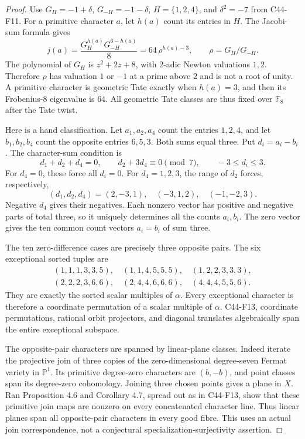 \documentclass[11pt]{article}
\theoremstyle{remark}\newtheorem{remark}[theorem]{Remark}
\begin{document}
\begin{proof}
Use \(G_H=-1+\delta\), \(G_{-H}=-1-\delta\),
\(H=\{1,2,4\}\), and \(\delta^2=-7\) from C44-F11.
For a primitive character \(a\), let \(h(a)\) count its entries in
\(H\). The Jacobi-sum formula gives
\[
 j(a)=\frac{G_H^{h(a)}G_{-H}^{6-h(a)}}8
     =64\,\rho^{h(a)-3},\qquad \rho=G_H/G_{-H}.
\]
The polynomial of \(G_H\) is \(z^2+2z+8\), with \(2\)-adic
Newton valuations \(1,2\). Therefore \(\rho\) has valuation
\(1\) or \(-1\) at a prime above \(2\) and is not a root of
unity. A primitive character is geometric Tate exactly when
\(h(a)=3\), and then its Frobenius-\(8\) eigenvalue is \(64\).
All geometric Tate classes are thus fixed over \(\mathbb F _8\)
after the Tate twist.

Here is a hand classification. Let \(a_1,a_2,a_4\) count the
entries \(1,2,4\), and let \(b_1,b_2,b_4\) count the opposite
entries \(6,5,3\). Both sums equal three. Put \(d_i=a_i-b_i\).
The character-sum condition is
\[
 d_1+d_2+d_4=0,\qquad d_2+3d_4\equiv0\pmod7,\qquad
 -3\le d_i\le3.
\]
For \(d_4=0\), these force all \(d_i=0\).
For \(d_4=1,2,3\), the range of \(d_2\) forces, respectively,
\[
 (d_1,d_2,d_4)=(2,-3,1),\quad(-3,1,2),\quad(-1,-2,3).
\]
Negative \(d_4\) gives their negatives. Each nonzero vector
has positive and negative parts of total three, so it uniquely
determines all the counts \(a_i,b_i\). The zero vector gives
the ten common count vectors \(a_i=b_i\) of sum three.

The ten zero-difference cases are precisely three opposite pairs.
The six exceptional sorted tuples are
\[
\begin{gathered}
 (1,1,1,3,3,5),\quad(1,1,4,5,5,5),\quad(1,2,2,3,3,3),\\
 (2,2,2,3,6,6),\quad(2,4,4,6,6,6),\quad(4,4,4,5,5,6).
\end{gathered}
\]
They are exactly the sorted scalar multiples of \(\alpha\).
Every exceptional character is therefore a coordinate permutation
of a scalar multiple of \(\alpha\). C44-F13, coordinate permutations,
rational orbit projectors, and diagonal translates algebraically
span the entire exceptional subspace.

The opposite-pair characters are spanned by linear-plane classes.
Indeed iterate the projective join of three copies of the
zero-dimensional degree-seven Fermat variety in \(\mathbb P^1\).
Its primitive degree-zero characters are \((b,-b)\), and point
classes span its degree-zero cohomology. Joining three chosen
points gives a plane in \(X\). Ran Proposition 4.6 and Corollary 4.7,
spread out as in C44-F13, show that these primitive join maps
are nonzero on every concatenated character line. Thus linear
planes span all opposite-pair characters in every good fibre.
This uses an actual join correspondence, not a conjectural
specialization-surjectivity assertion.


\end{proof}
\end{document}
